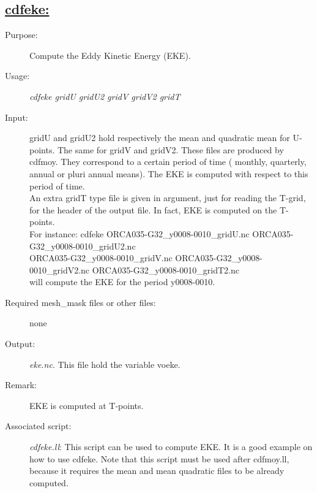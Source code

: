 \documentclass[a4paper,11pt]{article}
\begin{document}
\subsection*{\underline{cdfeke:}}
\begin{description}
\item[Purpose:] Compute the Eddy Kinetic Energy (EKE).
\item[Usage:] {\em cdfeke gridU gridU2 gridV gridV2 gridT}
\item[Input:] gridU and gridU2 hold respectively the mean and quadratic mean for U-points. The same for gridV and
gridV2. These files are produced by cdfmoy. They correspond to a certain period of time ( monthly, quarterly, annual or
pluri annual means). The EKE is computed with respect to this period of time. \\
An extra gridT type file is given in argument, just for reading the T-grid, for the header of the output file. In fact,
EKE is computed on the T-points.\\
For instance: cdfeke ORCA035-G32\_y0008-0010\_gridU.nc ORCA035-G32\_y0008-0010\_gridU2.nc \\
ORCA035-G32\_y0008-0010\_gridV.nc ORCA035-G32\_y0008-0010\_gridV2.nc ORCA035-G32\_y0008-0010\_gridT2.nc  \\
will compute the EKE for the period y0008-0010.
\item[Required mesh\_mask files or other files:]  none
\item[Output:] {\em eke.nc}. This file hold the variable voeke.
\item[Remark:]  EKE is computed at T-points.
\item[Associated script:] {\em cdfeke.ll}: This script can be used to compute EKE. It is a good
example on how to use cdfeke. Note that this script must be used after cdfmoy.ll, because it requires the mean and
mean quadratic files to be already computed.
\end{description}


\newpage
\end{document}
